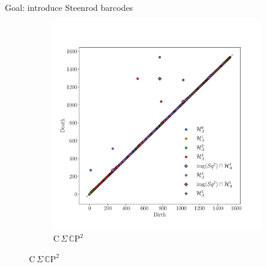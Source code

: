 \begin{frame}{Goal: introduce Steenrod barcodes}
\begin{figure}
\begin{subfigure}[b]{0.49\textwidth}
			\includegraphics[width=\textwidth]{aux/cp2.pdf}
			\caption{$\mathrm C\,\Sigma\,\mathbb C \mathrm P^2$}
			\label{f:cp2}
		\end{subfigure}
	\end{figure}
\end{frame}


